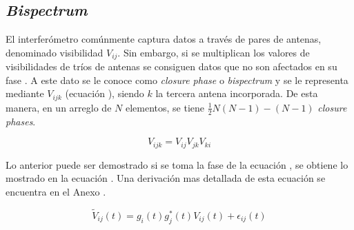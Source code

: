 \subsection{\textit{Bispectrum}}
\label{subsec:bispectrum}

El interferómetro comúnmente captura datos a través de pares de antenas, denominado visibilidad $V_{ij}$. Sin embargo, si se multiplican los valores de visibilidades de tríos de antenas se consiguen datos que no son afectados en su fase \citep{1958MNRAS.118..276J}. A este dato se le conoce como \textit{closure phase} o \textit{bispectrum} y se le representa mediante $V_{ijk}$ (ecuación ), siendo $k$ la tercera antena incorporada. De esta manera, en un arreglo de $N$ elementos, se tiene $\frac{1}{2}N(N-1) - (N-1)$ \textit{closure phases}.

\begin{equation}
    V_{ijk} = V_{ij}V_{jk}V_{ki}
    \label{eq:bispectrum}
\end{equation}


Lo anterior puede ser demostrado si se toma la fase de la ecuación , se obtiene lo mostrado en la ecuación . Una derivación mas detallada de esta ecuación se encuentra en el Anexo .

\begin{equation}
    \tilde{V}_{ij}(t) = g_{i}(t)g^{*}_{j}(t)V_{ij}(t) + \epsilon_{ij}(t)
    \label{eq:error3}
\end{equation}

